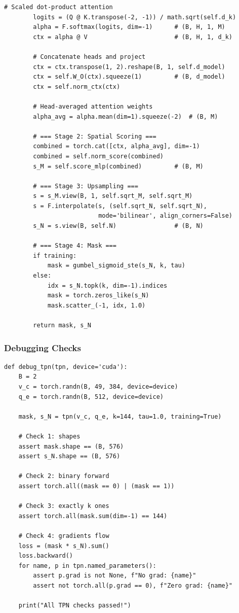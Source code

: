 \documentclass[11pt,a4paper]{article}
\begin{document}
\begin{lstlisting}[caption={TokenizationPolicyNetwork: full
  implementation.}]
        # Scaled dot-product attention
        logits = (Q @ K.transpose(-2, -1)) / math.sqrt(self.d_k)
        alpha = F.softmax(logits, dim=-1)      # (B, H, 1, M)
        ctx = alpha @ V                        # (B, H, 1, d_k)

        # Concatenate heads and project
        ctx = ctx.transpose(1, 2).reshape(B, 1, self.d_model)
        ctx = self.W_O(ctx).squeeze(1)         # (B, d_model)
        ctx = self.norm_ctx(ctx)

        # Head-averaged attention weights
        alpha_avg = alpha.mean(dim=1).squeeze(-2)  # (B, M)

        # === Stage 2: Spatial Scoring ===
        combined = torch.cat([ctx, alpha_avg], dim=-1)
        combined = self.norm_score(combined)
        s_M = self.score_mlp(combined)         # (B, M)

        # === Stage 3: Upsampling ===
        s = s_M.view(B, 1, self.sqrt_M, self.sqrt_M)
        s = F.interpolate(s, (self.sqrt_N, self.sqrt_N),
                          mode='bilinear', align_corners=False)
        s_N = s.view(B, self.N)                # (B, N)

        # === Stage 4: Mask ===
        if training:
            mask = gumbel_sigmoid_ste(s_N, k, tau)
        else:
            idx = s_N.topk(k, dim=-1).indices
            mask = torch.zeros_like(s_N)
            mask.scatter_(-1, idx, 1.0)

        return mask, s_N
\end{lstlisting}

\subsubsection{Debugging Checks}

\begin{lstlisting}[caption={Comprehensive TPN verification.}]
def debug_tpn(tpn, device='cuda'):
    B = 2
    v_c = torch.randn(B, 49, 384, device=device)
    q_e = torch.randn(B, 512, device=device)

    mask, s_N = tpn(v_c, q_e, k=144, tau=1.0, training=True)

    # Check 1: shapes
    assert mask.shape == (B, 576)
    assert s_N.shape == (B, 576)

    # Check 2: binary forward
    assert torch.all((mask == 0) | (mask == 1))

    # Check 3: exactly k ones
    assert torch.all(mask.sum(dim=-1) == 144)

    # Check 4: gradients flow
    loss = (mask * s_N).sum()
    loss.backward()
    for name, p in tpn.named_parameters():
        assert p.grad is not None, f"No grad: {name}"
        assert not torch.all(p.grad == 0), f"Zero grad: {name}"

    print("All TPN checks passed!")
\end{lstlisting}
\end{document}
